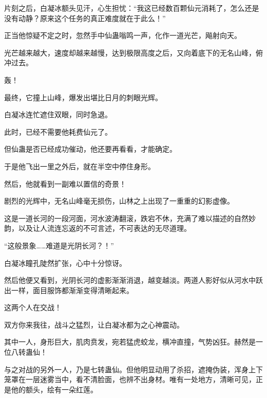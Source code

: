\begin{this_body}
片刻之后，白凝冰额头见汗，心生担忧：“我这已经数百颗仙元消耗了，怎么还是没有动静？原来这个任务的真正难度就在于此么！”

正当他惊疑不定之时，忽然手中仙蛊嗡鸣一声，化作一道光芒，飚射向天。

光芒越来越大，速度却越来越慢，达到极限高度之后，又向着底下的无名山峰，俯冲过去。

轰！

最终，它撞上山峰，爆发出堪比日月的刺眼光辉。

白凝冰连忙遮住双眼，同时急退。

此时，已经不需要他耗费仙元了。

但仙蛊是否已经成功催动，他还要再看看，才能确定。

于是他飞出一里之外后，就在半空中停住身形。

然后，他就看到一副难以置信的奇景！

剧烈的光辉中，无名山峰毫无损伤，山林之上出现了一重重的幻影虚像。

这是一道长河的一段河面，河水波涛翻滚，跌宕不休，充满了难以描述的自然妙韵，以及让人流连忘返的不可言述，不可表达的无尽道理。

“这般景象……难道是光阴长河？！”

白凝冰瞳孔陡然扩张，心中十分惊讶。

然后他便又看到，光阴长河的虚影渐渐消退，越变越淡。两道人影好似从河水中跃出一样，面目服饰都渐渐变得清晰起来。

这两个人在交战！

双方你来我往，战斗之猛烈，让白凝冰都为之心神震动。

其中一人，身形巨大，肌肉贲发，宛若猛虎蛟龙，横冲直撞，气势凶狂。赫然是一位八转蛊仙！

与之对战的另外一人，乃是七转蛊仙。但他明显动用了杀招，遮掩伪装，浑身上下笼罩在一层迷雾当中，看不清脸面，也辨不出身材。唯有一处地方，清晰可见，正是他的额头，绘有一朵红莲。

\end{this_body}

